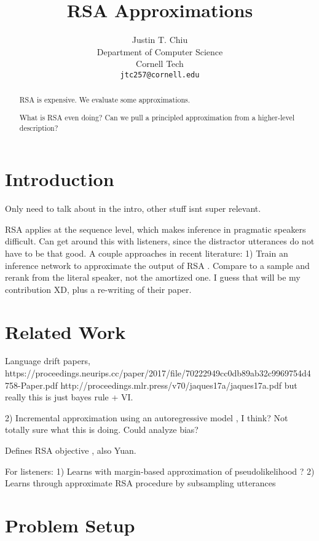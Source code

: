 \documentclass[11pt,a4paper]{article}
\title{RSA Approximations}
\author{Justin T. Chiu\\
  Department of Computer Science \\
  Cornell Tech \\
  \texttt{jtc257@cornell.edu}\\
}
\date{}
\begin{document}
\maketitle
\begin{abstract}
RSA is expensive.
We evaluate some approximations.

What is RSA even doing?
Can we pull a principled approximation from a higher-level description?
\end{abstract}


\section{Introduction}

Only need to talk about \citet{white2020learning} in the intro,
other stuff isnt super relevant.

RSA applies at the sequence level, which makes inference in pragmatic speakers difficult.
Can get around this with listeners, since the distractor utterances do not have to be that good.
A couple approaches in recent literature:
1) Train an inference network to approximate the output of RSA \citep{white2020learning}.
Compare to a sample and rerank from the literal speaker, not the amortized one.
I guess that will be my contribution XD, plus a re-writing of their paper.

\section{Related Work}
Language drift papers, 
https://proceedings.neurips.cc/paper/2017/file/70222949cc0db89ab32c9969754d4758-Paper.pdf
http://proceedings.mlr.press/v70/jaques17a/jaques17a.pdf
but really this is just bayes rule + VI.

2) Incremental approximation using an autoregressive model
\citep{cohngordon2018pragmatically}, I think? Not totally sure what this is doing.
Could analyze bias?

Defines RSA objective \citep{zaslavsky2020ratedistortion}, also Yuan.

For listeners:
1) Learns with margin-based approximation of pseudolikelihood \citep{gulordava2020dax}?
2) Learns through approximate RSA procedure by subsampling utterances \citep{mcdowell2019learning}

\section{Problem Setup}
\end{document}
